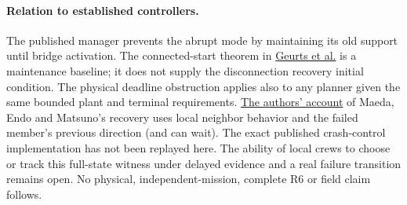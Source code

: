 \documentclass{article}
\begin{document}
\paragraph{Relation to established controllers.}
The published manager prevents the abrupt mode by maintaining its
old support until bridge activation. The connected-start theorem in
\href{https://arxiv.org/pdf/2609.19912}{Geurts et al.} is a maintenance
baseline; it does not supply the disconnection recovery initial
condition. The physical deadline obstruction applies also to
any planner given the same bounded plant and terminal requirements.
\href{https://en.endo-lab.jp/research/detail/499}{The authors' account}
of Maeda, Endo and Matsuno's recovery uses local neighbor behavior
and the failed member's previous direction (and can wait).
The exact published crash-control implementation has not been
replayed here. The ability of local crews to choose or track this
full-state witness under delayed evidence and a real failure
transition remains open. No physical, independent-mission, complete
R6 or field claim follows.
\end{document}
